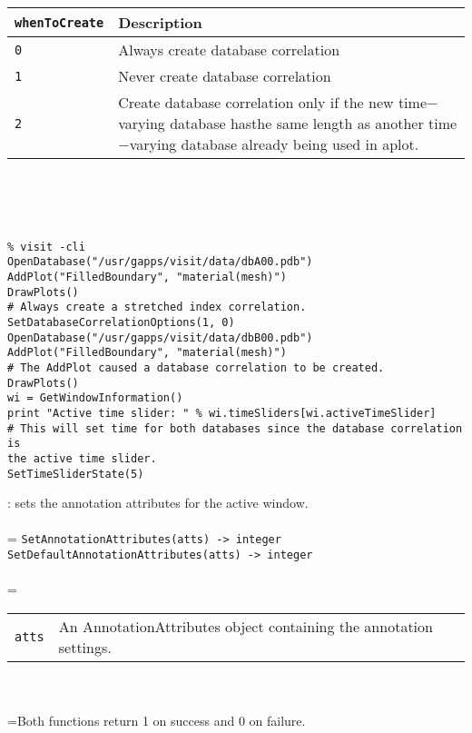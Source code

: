 \documentclass[10pt,a4paper]{report}
\begin{document}
\begin{tabular}{|l|p{9cm}|}
\hline
\verb!whenToCreate! & Description \\
\hline \hline
\verb!0! & Always create database correlation \\
\verb!1! & Never create database correlation \\
\verb!2! & Create database correlation only if the new time$-$varying database hasthe same length as another time$-$varying database already being used in aplot. \\
\hline
\end{tabular} \\[-2mm]
\\[-3mm] 

\\[-6mm]
\begin{verbatim}% visit -cli
OpenDatabase("/usr/gapps/visit/data/dbA00.pdb")
AddPlot("FilledBoundary", "material(mesh)")
DrawPlots()
# Always create a stretched index correlation.
SetDatabaseCorrelationOptions(1, 0)
OpenDatabase("/usr/gapps/visit/data/dbB00.pdb")
AddPlot("FilledBoundary", "material(mesh)")
# The AddPlot caused a database correlation to be created.
DrawPlots()
wi = GetWindowInformation()
print "Active time slider: " % wi.timeSliders[wi.activeTimeSlider]
# This will set time for both databases since the database correlation is
the active time slider.
SetTimeSliderState(5)
\end{verbatim}
\newpage


{}
: sets the annotation attributes for the active window.\\[-3mm]

 \\ 
\hangindent=\parindent 
\verb!SetAnnotationAttributes(atts) -> integer!\\ 
\verb!SetDefaultAnnotationAttributes(atts) -> integer!\\ [-3mm]

 \\ 
\hangindent=\parindent 
\begin{tabular}{lp{9cm}}
\verb!atts! & An AnnotationAttributes object containing the annotation settings. \\
\end{tabular} \\[-2mm]


 \\ 
\hangindent=\parindent Both functions return 1 on success and 0 on failure. \\[-3mm] 
\end{document}

